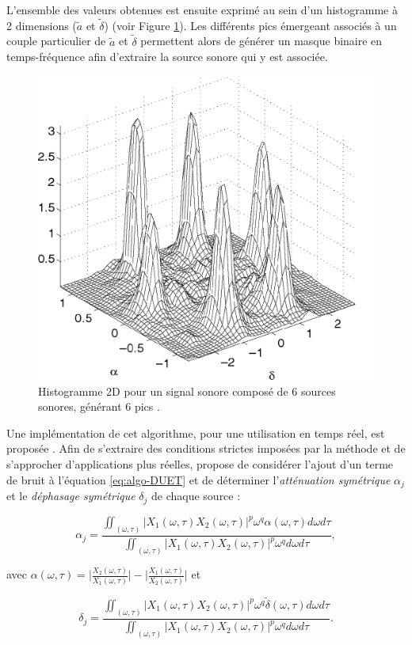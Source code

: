 L'ensemble des valeurs obtenues est ensuite exprimé au sein d'un histogramme à 2 dimensions ($\tilde{a}$ et $\tilde{\delta}$) (voir Figure \ref{fig:DUET_hist}).
Les différents pics émergeant associés à un couple particulier de $\tilde{a}$ et $\tilde{\delta}$ permettent alors de générer un masque binaire en temps-fréquence afin d'extraire la source sonore qui y est associée.

\begin{figure}[t]
\centering
\includegraphics[width = 0.6\linewidth]{./figures/autres/DUET_histogram.png}
\caption{Histogramme 2D pour un signal sonore composé de 6 sources sonores, générant 6 pics \cite{yilmaz2004blind}.}
\label{fig:DUET_hist}
\end{figure}

Une implémentation de cet algorithme, pour une utilisation en temps réel, est proposée \cite{rickard2001real}.
Afin de s'extraire des conditions strictes imposées par la méthode et de s'approcher d'applications plus réelles, \cite{rickard2007duet} propose de considérer l'ajout d'un terme de bruit à l'équation \ref{eq:algo-DUET} et de déterminer l'\textit{atténuation symétrique} $\alpha_j$ et le \textit{déphasage symétrique} $\delta_j$ de chaque source :

\begin{equation}
\alpha_j = \frac{\iint_{(\omega,\tau)} \vert X_1(\omega,\tau) X_2(\omega,\tau)\vert ^p \omega^q \alpha(\omega,\tau) d\omega d\tau}{\iint_{(\omega,\tau)}\vert X_1(\omega,\tau) X_2(\omega,\tau)\vert ^p \omega^q d\omega d\tau},
\end{equation}

avec $\alpha(\omega,\tau) = \bigg\vert \frac{X_2(\omega,\tau)}{X_1(\omega,\tau)} \bigg\vert - \bigg\vert  \frac{X_1(\omega,\tau)}{X_2(\omega,\tau)} \bigg\vert$ et

\begin{equation}
\delta_j = \frac{\iint_{(\omega,\tau)} \vert X_1(\omega,\tau) X_2(\omega,\tau)\vert ^p \omega^q \tilde{\delta}(\omega,\tau) d\omega d\tau}{\iint_{(\omega,\tau)}\vert X_1(\omega,\tau) X_2(\omega,\tau)\vert ^p \omega^q d\omega d\tau}.
\end{equation}

